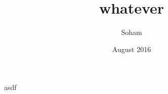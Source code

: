 \documentclass{article}
\title{whatever}
\author{Soham}
\date{August 2016}
\begin{document}
\maketitle
asdf
\end{document}

